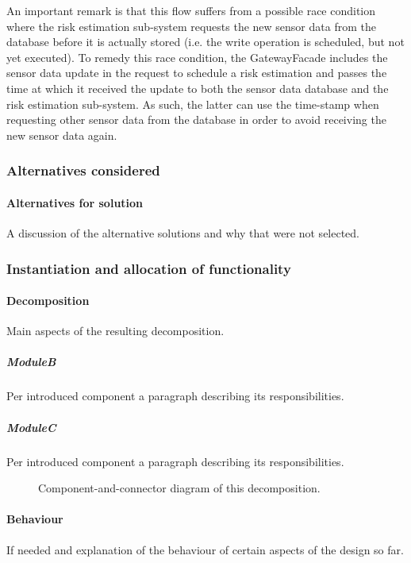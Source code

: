 \documentclass[a4paper,10pt]{article}
\begin{document}
An important remark is that this flow suffers from a possible race condition where the risk estimation sub-system requests the new sensor data from the database before it is actually stored (i.e. the write operation is scheduled, but not yet executed). To remedy this race condition, the GatewayFacade includes the sensor data update in the request to schedule a risk estimation and passes the time at which it received the update to both the sensor data database and the risk estimation sub-system. As such, the latter can use the time-stamp when requesting other sensor data from the database in order to avoid receiving the new sensor data again.

\subsubsection*{Alternatives considered}
\paragraph{Alternatives for solution}
A discussion of the alternative solutions and why that were not selected.

\subsubsection{Instantiation and allocation of functionality}
\paragraph{Decomposition}
Main aspects of the resulting decomposition.

\subparagraph{ModuleB}
Per introduced component a paragraph describing its responsibilities.

\subparagraph{ModuleC}
Per introduced component a paragraph describing its responsibilities.

\begin{figure}[!htp]
    \centering
    \caption{Component-and-connector diagram of this decomposition.
        }\label{fig:it1-cc_main}
\end{figure}

\paragraph{Behaviour}
If needed and explanation of the behaviour of certain aspects of the design so
far.
\end{document}
